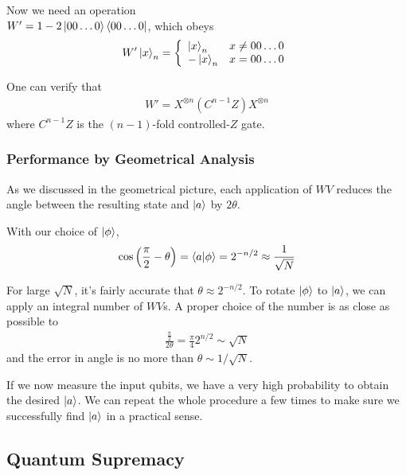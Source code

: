 Now we need an operation\\ $W'=1-2\ket{00\dots0}\bra{00\dots0}$, which obeys
\begin{align*}
    W' \ket{x}_n=\left\{ \begin{array}{ll}
        \ket{x}_n & x\ne 00\dots0\\
        -\ket{x}_n & x=00\dots0
    \end{array} \right.
\end{align*}

One can verify that 
\begin{align*}
    W' =X^{\otimes n}(C^{n-1} Z)X^{\otimes n}
\end{align*}
where $C^{n-1}Z$ is the $(n-1)$-fold controlled-$Z$ gate. 

\subsubsection{Performance by Geometrical Analysis}
As we discussed in the geometrical picture, each application of $WV$ reduces the angle between the resulting state and $\ket{a}$ by $2\theta$.

With our choice of $\ket{\phi}$,
\begin{align*}
    \cos\left( \frac{\pi}{2}-\theta \right)=\braket{a|\phi}=2^{-n/2}\approx \frac{1}{\sqrt{N}}
\end{align*}

For large $\sqrt{N}$, it's fairly accurate that $\theta\approx 2^{-n/2}$. To rotate $\ket{\phi}$ to $\ket{a}$, we can apply an integral number of $WV$s. A proper choice of the number is as close as possible to
\begin{align*}
    \frac{\frac{\pi}{2}}{2\theta}=\frac{\pi}{4}2^{n/2}\sim \sqrt{N}
\end{align*}
and the error in angle is no more than $\theta \sim 1/\sqrt{N}$. 

If we now measure the input qubits, we have a very high probability to obtain the desired $\ket{a}$. We can repeat the whole procedure a few times to make sure we successfully find $\ket{a}$ in a practical sense.

\subsection{Quantum Supremacy}

